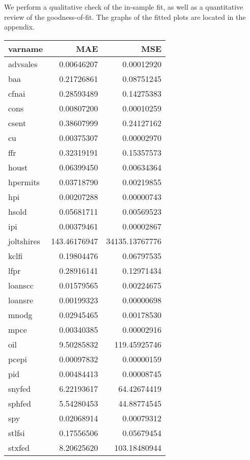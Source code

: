 \documentclass[11pt, letterpaper]{article}\usepackage[]{graphicx}\usepackage[]{color}
\begin{document}
We perform a qualitative check of the in-sample fit, as well as a quantitative review of the goodness-of-fit. The graphs of the fitted plots are located in the appendix.
\begin{table}[H]
\centering
\begingroup\footnotesize
\begin{tabular}{lrr}
  \hline
varname & MAE & MSE \\ 
  \hline
advsales & 0.00646207 & 0.00012920 \\ 
  baa & 0.21726861 & 0.08751245 \\ 
  cfnai & 0.28593489 & 0.14275383 \\ 
  cons & 0.00807200 & 0.00010259 \\ 
  csent & 0.38607999 & 0.24127162 \\ 
  cu & 0.00375307 & 0.00002970 \\ 
  ffr & 0.32319191 & 0.15357573 \\ 
  houst & 0.06399450 & 0.00634364 \\ 
  hpermits & 0.03718790 & 0.00219855 \\ 
  hpi & 0.00207288 & 0.00000743 \\ 
  hsold & 0.05681711 & 0.00569523 \\ 
  ipi & 0.00379461 & 0.00002867 \\ 
  joltshires & 143.46176947 & 34135.13767776 \\ 
  kclfi & 0.19804476 & 0.06797535 \\ 
  lfpr & 0.28916141 & 0.12971434 \\ 
  loanscc & 0.01579565 & 0.00224675 \\ 
  loansre & 0.00199323 & 0.00000698 \\ 
  mnodg & 0.02945465 & 0.00178530 \\ 
  mpce & 0.00340385 & 0.00002916 \\ 
  oil & 9.50285832 & 119.45925746 \\ 
  pcepi & 0.00097832 & 0.00000159 \\ 
  pid & 0.00484413 & 0.00008745 \\ 
  snyfed & 6.22193617 & 64.42674419 \\ 
  sphfed & 5.54280453 & 44.88774545 \\ 
  spy & 0.02068914 & 0.00079312 \\ 
  stlfsi & 0.17556506 & 0.05679454 \\ 
  stxfed & 8.20625620 & 103.18480944 \\ 

\end{tabular}
\end{table}
\end{document}
